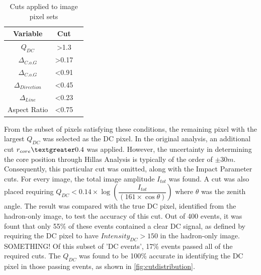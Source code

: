 \documentclass[]{article}
\begin{document}
\begin{table}[h!]
  \centering
  \caption{Cuts applied to image pixel sets}
  \label{tab:table1}
  \begin{tabular}{ccc}
    \toprule
    Variable & Cut\\
    \midrule
     $Q_{DC}$ & \textgreater 1.3 \\
     $ \Delta_{C.o.G}$ & \textgreater 0.17 \\
     $ \Delta_{C.o.G}$ & \textless 0.91 \\
     $\Delta_{Direction}$ & \textless 0.45 \\
     $\Delta_{Line}$ & \textless 0.23 \\
     Aspect Ratio & \textless 0.75 \\
    \bottomrule
  \end{tabular}
\end{table}

From the subset of pixels satisfying these conditions, the remaining pixel with the largest $Q_{DC}$ was selected as the DC pixel. In the original analysis, an additional cut $r_{core} \textgreater 0.4$ was applied. However, the uncertainty in determining the core position through Hillas Analysis is typically of the order of $\pm 30m$. Consequently, this particular cut was omitted, along with the Impact Parameter cuts. For every image, the total image amplitude $I_{tot}$ was found. A cut was also placed requiring $Q_{DC} < 0.14 \times \log(\dfrac{I_{tot}}{(161 \times \cos \theta)})$ where $\theta$ was the zenith angle. The result was compared with the true DC pixel, identified from the hadron-only image, to test the accuracy of this cut. Out of 400 events, it was fount that only 55\% of these events contained a clear DC signal, as defined by requiring the DC pixel to have $Intensity_{DC} > 150$ in the hadron-only image. SOMETHING! Of this subset of 'DC events', 17\% events passed all of the required cuts. The $Q_{DC}$ was found to be 100\% accurate in identifying the DC pixel in those passing events, as shown in \ref{fig:cutdistribution}.
\end{document}
